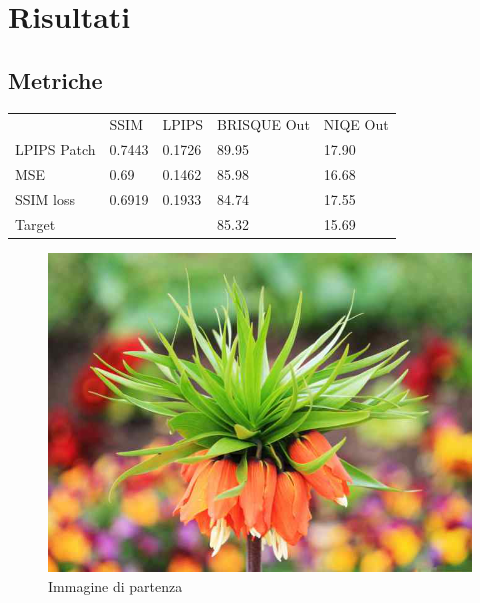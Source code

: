 \chapter{Risultati}

\section{Metriche}

\begin{tabular}{lllll}
            & SSIM   & LPIPS  & BRISQUE Out & NIQE Out \\
LPIPS Patch & 0.7443 & 0.1726 & 89.95       & 17.90    \\
MSE         & 0.69   & 0.1462 & 85.98       & 16.68    \\
SSIM loss   & 0.6919 & 0.1933 & 84.74       & 17.55    \\
Target      &        &        & 85.32       & 15.69   
\end{tabular}

\begin{figure}[h]
      \includegraphics[scale=0.5]{img/flower_512_validation.png}
      \caption{Immagine di partenza}
      \centering
\end{figure}

